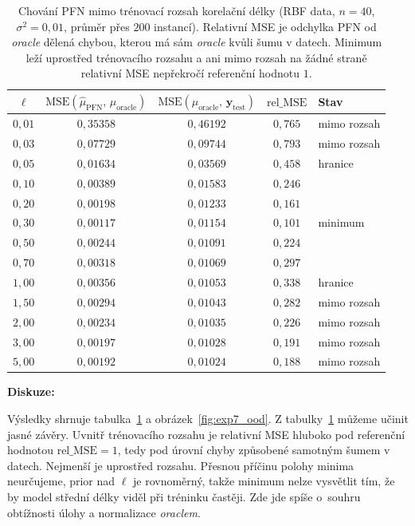 \begin{table}[H]
\centering
\begin{tabular}{ccccl}
\hline
$\ell$ & $\text{MSE}(\hat\mu_{\text{PFN}},\, \mu_{\text{oracle}})$ & $\text{MSE}(\mu_{\text{oracle}},\, \mathbf{y}_{\text{test}})$ & $\text{rel\_MSE}$ & Stav \\
\hline
$0{,}01$ & $0{,}35358$ & $0{,}46192$ & $0{,}765$ & mimo rozsah \\
$0{,}03$ & $0{,}07729$ & $0{,}09744$ & $0{,}793$ & mimo rozsah \\
$0{,}05$ & $0{,}01634$ & $0{,}03569$ & $0{,}458$ & hranice \\
$0{,}10$ & $0{,}00389$ & $0{,}01583$ & $0{,}246$ & \\
$0{,}20$ & $0{,}00198$ & $0{,}01233$ & $0{,}161$ & \\
$0{,}30$ & $0{,}00117$ & $0{,}01154$ & $0{,}101$ & minimum \\
$0{,}50$ & $0{,}00244$ & $0{,}01091$ & $0{,}224$ & \\
$0{,}70$ & $0{,}00318$ & $0{,}01069$ & $0{,}297$ & \\
$1{,}00$ & $0{,}00356$ & $0{,}01053$ & $0{,}338$ & hranice \\
$1{,}50$ & $0{,}00294$ & $0{,}01043$ & $0{,}282$ & mimo rozsah \\
$2{,}00$ & $0{,}00234$ & $0{,}01035$ & $0{,}226$ & mimo rozsah \\
$3{,}00$ & $0{,}00197$ & $0{,}01028$ & $0{,}191$ & mimo rozsah \\
$5{,}00$ & $0{,}00192$ & $0{,}01024$ & $0{,}188$ & mimo rozsah \\
\hline
\end{tabular}
\caption{Chování PFN mimo trénovací rozsah korelační délky (RBF data, $n = 40$, $\sigma^2 = 0{,}01$, průměr přes $200$ instancí). Relativní MSE je odchylka PFN od \emph{oracle} dělená chybou, kterou má sám \emph{oracle} kvůli šumu v datech. Minimum leží uprostřed trénovacího rozsahu a ani mimo rozsah na žádné straně relativní MSE nepřekročí referenční hodnotu $1$.}
\label{tab:exp7_ood}
\end{table}

\textbf{Diskuze:}

Výsledky shrnuje tabulka~\ref{tab:exp7_ood} a obrázek~\ref{fig:exp7_ood}.
Z tabulky~\ref{tab:exp7_ood} můžeme učinit jasné závěry.
Uvnitř trénovacího rozsahu je relativní MSE hluboko pod referenční hodnotou $\text{rel\_MSE} = 1$, tedy pod úrovní chyby způsobené samotným šumem v datech.
Nejmenší je uprostřed rozsahu.
Přesnou příčinu polohy minima neurčujeme, prior nad $\ell$ je rovnoměrný, takže minimum nelze vysvětlit tím, že by model střední délky viděl při tréninku častěji.
Zde jde spíše o~souhru obtížnosti úlohy a normalizace \emph{oraclem}.
\par

